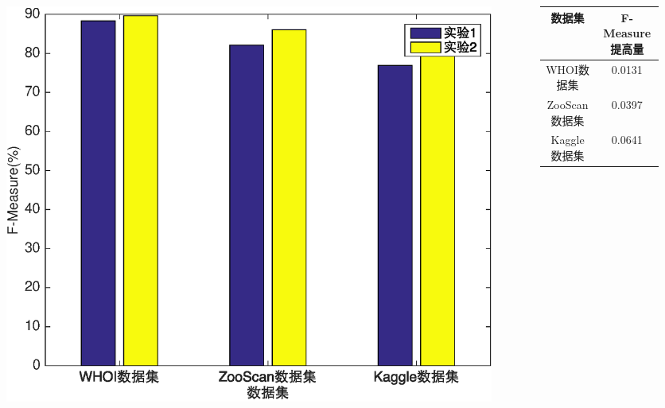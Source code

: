 \documentclass[notheorems,mathserif,table,compress]{beamer}  %
\begin{document}
\begin{frame}
\begin{columns}
\begin{column}{0.5\linewidth}
\begin{figure}
\includegraphics[width=0.8\linewidth]{comp12}
\end{figure}
\end{column}

\begin{column}{0.5\linewidth}
\begin{table}
\scriptsize
  \centering
  \begin{tabular}[c]{cc}
    \toprule
    数据集 & F-Measure提高量\\
    \midrule
    WHOI数据集 & 0.0131\\
    ZooScan数据集 & 0.0397\\
    Kaggle数据集 & 0.0641\\
    \bottomrule
  \end{tabular}
\end{table}
\end{column}
\end{columns}\vspace{1ex}
\end{frame}

\end{document}
